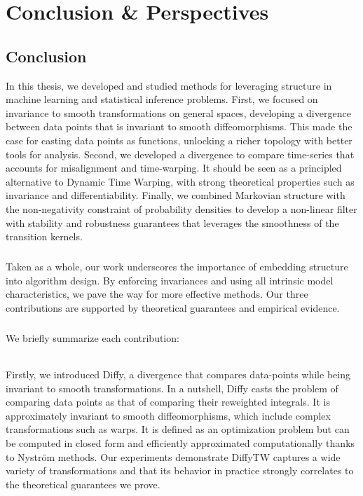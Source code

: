\chapter{Conclusion \& Perspectives}\label{ch:conclusion}

\section{Conclusion}
In this thesis, we developed and studied methods for leveraging structure in machine learning and statistical inference problems. First, we focused on invariance to smooth transformations on general spaces, developing a divergence between data points that is invariant to smooth diffeomorphisms. This made the case for casting data points as functions, unlocking a richer topology with better tools for analysis.
Second, we developed a divergence to compare time-series that accounts for misalignment and time-warping. It should be seen as a principled alternative to Dynamic Time Warping, with strong theoretical properties such as invariance and differentiability.
Finally, we combined Markovian structure with the non-negativity constraint of probability densities to develop a non-linear filter with stability and robustness guarantees that leverages the smoothness of the transition kernels.

\paragraph{}
Taken as a whole, our work underscores the importance of embedding structure into algorithm design. By enforcing invariances and using all intrinsic model characteristics, we pave the way for more effective methods. Our three contributions are supported by theoretical guarantees and empirical evidence.

\paragraph{}
\noindent We briefly summarize each contribution:

\subparagraph{}
Firstly, we introduced Diffy, a divergence that compares data-points while being invariant to smooth transformations. In a nutshell, Diffy casts the problem of comparing data points as that of comparing their reweighted integrals. It is approximately invariant to smooth diffeomorphisms, which include complex transformations such as warps. It is defined as an optimization problem but can be computed in closed form and efficiently approximated computationally thanks to Nyström methods. Our experiments demonstrate DiffyTW captures a wide variety of transformations and that its behavior in practice strongly correlates to the theoretical guarantees we prove.

